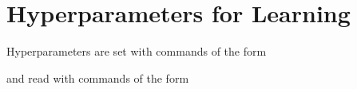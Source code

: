 \documentclass[letterpaper,10pt,english]{sphinxmanual}
\begin{document}
\section{Hyper\sphinxhyphen{}parameters for Learning}
\label{\detokenize{index:hyper-parameters-for-learning}}
\sphinxAtStartPar
Hyper\sphinxhyphen{}parameters are set with commands of the form

\begin{sphinxVerbatim}[commandchars=\\\{\}]
 
\end{sphinxVerbatim}

\sphinxAtStartPar
and read with commands of the form
\end{document}
